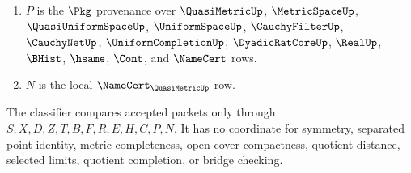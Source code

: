 \begin{definition}
\begin{enumerate}
\item $P$ is the $\Pkg$ provenance over $\QuasiMetricUp$, $\MetricSpaceUp$, $\QuasiUniformSpaceUp$, $\UniformSpaceUp$, $\CauchyFilterUp$, $\CauchyNetUp$, $\UniformCompletionUp$, $\DyadicRatCoreUp$, $\RealUp$, $\BHist$, $\hsame$, $\Cont$, and $\NameCert$ rows.
\item $N$ is the local $\NameCert_{\QuasiMetricUp}$ row.
\end{enumerate}
The classifier compares accepted packets only through $S,X,D,Z,T,B,F,R,E,H,C,P,N$. It has no coordinate for symmetry, separated point identity, metric completeness, open-cover compactness, quotient distance, selected limits, quotient completion, or bridge checking.
\end{definition}

